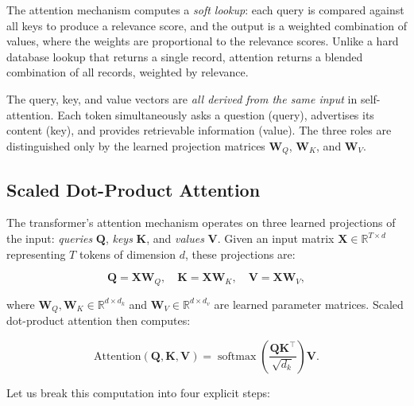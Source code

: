 The attention mechanism computes a \emph{soft lookup}: each query is compared against all keys to produce a relevance score, and the output is a weighted combination of values, where the weights are proportional to the relevance scores. Unlike a hard database lookup that returns a single record, attention returns a blended combination of all records, weighted by relevance.

\begin{remark}
The query, key, and value vectors are \emph{all derived from the same input} in self-attention. Each token simultaneously asks a question (query), advertises its content (key), and provides retrievable information (value). The three roles are distinguished only by the learned projection matrices $\mathbf{W}_Q$, $\mathbf{W}_K$, and $\mathbf{W}_V$.
\end{remark}

\subsection{Scaled Dot-Product Attention}

The transformer's attention mechanism operates on three learned projections of the input: \emph{queries} $\mathbf{Q}$, \emph{keys} $\mathbf{K}$, and \emph{values} $\mathbf{V}$. Given an input matrix $\mathbf{X} \in \mathbb{R}^{T \times d}$ representing $T$ tokens of dimension $d$, these projections are:

\begin{equation}
\mathbf{Q} = \mathbf{X}\mathbf{W}_Q, \quad
\mathbf{K} = \mathbf{X}\mathbf{W}_K, \quad
\mathbf{V} = \mathbf{X}\mathbf{W}_V,
\label{eq:qkv}
\end{equation}

where $\mathbf{W}_Q, \mathbf{W}_K \in \mathbb{R}^{d \times d_k}$ and $\mathbf{W}_V \in \mathbb{R}^{d \times d_v}$ are learned parameter matrices. Scaled dot-product attention then computes:

\begin{equation}
\text{Attention}(\mathbf{Q}, \mathbf{K}, \mathbf{V}) = \operatorname{softmax}\!\left(\frac{\mathbf{Q}\mathbf{K}^\top}{\sqrt{d_k}}\right)\mathbf{V}.
\label{eq:scaled-attention}
\end{equation}

Let us break this computation into four explicit steps:


